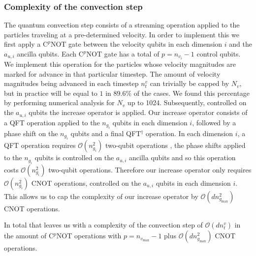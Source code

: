 \subsubsection{Complexity of the convection step}\label{sssec:compl conv step}
The quantum convection step consists of a streaming operation applied to the particles traveling at a pre-determined velocity. In order to implement this we first apply a $\text{C}^p\text{NOT}$ gate between the velocity qubits in each dimension $i$ and the $a_{u,i}$ ancilla qubits. Each $\text{C}^p\text{NOT}$ gate has a total of $p=n_{v_i}-1$ control qubits. We implement this operation for the particles whose velocity magnitudes are marked for advance in that particular timestep. The amount of velocity magnitudes being advanced in each timestep $n^v_t$ can trivially be capped by $N_v$, but in practice will be equal to $1$ in $89.6\%$ of the cases. We found this percentage by performing numerical analysis for $N_v$ up to 1024. 
Subsequently, controlled on the $a_{u,i}$ qubits the increase operator is applied.
Our increase operator consists of a QFT operation applied to the $n_{g_i}$ qubits in each dimension $i$, followed by a phase shift on the $n_{g_i}$ qubits and a final QFT$^\dagger$ operation. In each dimension $i$, a QFT operation requires $\mathcal{O}(n_{g_i}^2)$ two-qubit operations \cite{Musk2020}, the phase shifts applied to the $n_{g_i}$ qubits is controlled on the $a_{u,i}$ ancilla qubits and so this operation costs $\mathcal{O}(n_{g_i}^2)$ two-qubit operations. 
Therefore our increase operator only requires $\mathcal{O}(n_{g_i}^2)$ CNOT operations, controlled on the $a_{u,i}$ qubits in each dimension $i$.
This allows us to cap the complexity of our increase operator by $\mathcal{O}(d n_{g_\text{max}}^2)$ CNOT operations.

In total that leaves us with a complexity of the convection step of $\mathcal{O} \left ( d n^v_t \right )$ in the amount of C$^p$NOT operations with $p=n_{v_\text{max}}-1$ plus $\mathcal{O} \left ( d n_{g_\text{max}}^2 \right )$ CNOT operations.\\

